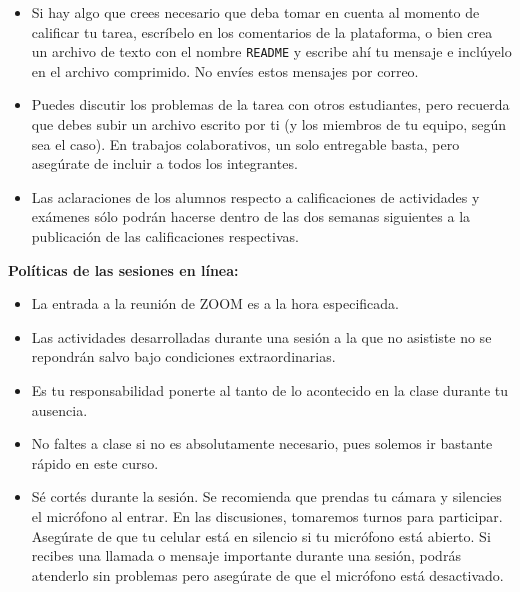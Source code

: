\documentclass[12pt, letterpaper, oneside]{article}
\begin{document}
\begin{itemize}
  \item Si hay algo que crees necesario que deba tomar en cuenta al momento de calificar tu tarea, escríbelo en los comentarios de la plataforma, o bien crea un archivo de texto con el nombre \texttt{README} y escribe ahí tu mensaje e inclúyelo en el archivo comprimido. No envíes estos mensajes por correo.
  \item Puedes discutir los problemas de la tarea con otros estudiantes, pero recuerda que debes subir un archivo escrito por ti (y los miembros de tu equipo, según sea el caso). En trabajos colaborativos, un solo entregable basta, pero asegúrate de incluir a todos los integrantes.
  \item Las aclaraciones de los alumnos respecto a calificaciones de actividades y exámenes sólo podrán hacerse dentro de las dos semanas siguientes a la publicación de las calificaciones respectivas.
  \end{itemize}

  \pagebreak
  \noindent\textbf{Políticas de las sesiones en línea:}  
  \begin{itemize}
  \item La entrada a la reunión de ZOOM es a la hora especificada.
  \item Las actividades desarrolladas durante una sesión a la que no asististe no se repondrán salvo bajo condiciones extraordinarias.
  \item Es tu responsabilidad ponerte al tanto de lo acontecido en la clase durante tu ausencia.
  \item No faltes a clase si no es absolutamente necesario, pues solemos ir bastante rápido en este curso.
  \item Sé cortés durante la sesión. Se recomienda que prendas tu cámara y silencies el micrófono al entrar. En las discusiones, tomaremos turnos para participar. Asegúrate de que tu celular está en silencio si tu micrófono está abierto. Si recibes una llamada o mensaje importante durante una sesión, podrás atenderlo sin problemas pero asegúrate de que el micrófono está desactivado.\footnotemark
  \end{itemize}
\end{document}
